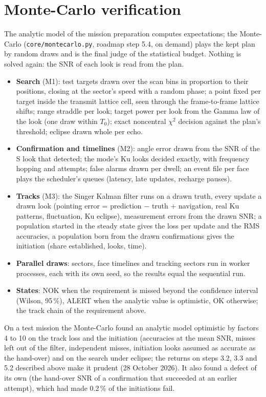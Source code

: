 \documentclass[11pt,a4paper]{article}
\newcommand{\code}[1]{\texttt{\small #1}}
\begin{document}
\section{Monte-Carlo verification}\label{sec:mc}
The analytic model of the mission preparation computes expectations; the Monte-Carlo (\code{core/montecarlo.py},
roadmap step 5.4, on demand) plays the kept plan by random draws and is the final judge of the statistical budget.
Nothing is solved again: the SNR of each look is read from the plan.
\begin{itemize}
  \item \textbf{Search} (M1): test targets drawn over the scan bins in proportion to their positions, closing at the
        sector's speed with a random phase; a point fixed per target inside the transmit lattice cell, seen through
        the frame-to-frame lattice shifts; range straddle per look; target power per look from the Gamma law of the
        look (one draw within $T_0$); exact noncentral $\chi^2$ decision against the plan's threshold; eclipse drawn
        whole per echo.
  \item \textbf{Confirmation and timelines} (M2): angle error drawn from the SNR of the S look that detected; the
        mode's Ku looks decided exactly, with frequency hopping and attempts; false alarms drawn per dwell; an event
        file per face plays the scheduler's queues (latency, late updates, recharge pauses).
  \item \textbf{Tracks} (M3): the Singer Kalman filter runs on a drawn truth, every update a drawn look (pointing
        error = prediction $-$ truth + navigation, real Ku patterns, fluctuation, Ku eclipse), measurement errors from
        the drawn SNR; a population started in the steady state gives the loss per update and the RMS accuracies, a
        population born from the drawn confirmations gives the initiation (share established, looks, time).
  \item \textbf{Parallel draws}: sectors, face timelines and tracking sectors run in worker processes, each with
        its own seed, so the results equal the sequential run.
  \item \textbf{States}: NOK when the requirement is missed beyond the confidence interval (Wilson, 95\,\%), ALERT
        when the analytic value is optimistic, OK otherwise; the track chain of the requirement above.
\end{itemize}
On a test mission the Monte-Carlo found an analytic model optimistic by factors 4 to 10 on the track loss and the
initiation (accuracies at the mean SNR, misses left out of the filter, independent misses, initiation looks assumed as
accurate as the hand-over) and on the search under eclipse; the returns on steps 3.2, 3.3 and 5.2 described above
make it prudent (28 October 2026). It also found a defect of its own (the hand-over SNR of a confirmation that
succeeded at an earlier attempt), which had made 0.2\,\% of the initiations fail.
\end{document}
